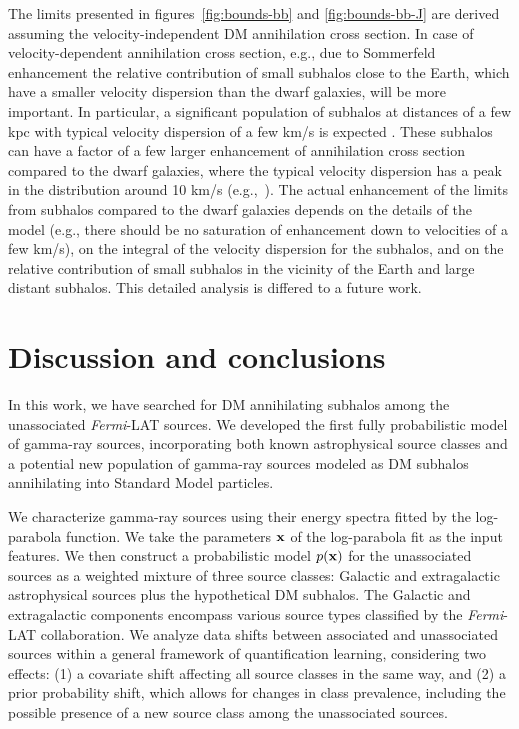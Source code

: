 \documentclass[12pt, a4paper]{article}
\newcommand{\Fermi}{{\sl Fermi}}
\begin{document}
The limits presented in figures~\ref{fig:bounds-bb} and \ref{fig:bounds-bb-J} are derived assuming the velocity-independent DM annihilation cross section.
In case of velocity-dependent annihilation cross section, e.g., due to Sommerfeld enhancement \cite{2009PhRvD..79a5014A, Piccirillo:2022qet, Lacroix:2022cjm, Facchinetti:2022jtd}
the relative contribution of small subhalos close to the Earth, which have a smaller velocity dispersion than the dwarf galaxies, will be more important.
In particular, a significant population of subhalos at distances of a few kpc with typical velocity dispersion of a few km/s is expected \cite{2024MNRAS.530.2496A}.
These subhalos can have a factor of a few larger enhancement of annihilation cross section compared to the dwarf galaxies, where the typical velocity dispersion has a peak in the distribution around 10 km/s (e.g.,~\cite{2018JCAP...04..035L}).
The actual enhancement of the limits from subhalos compared to the dwarf galaxies depends on the details of the model (e.g., there should be no saturation of enhancement down to velocities of a few km/s), on the integral of the velocity dispersion for the subhalos, and on the relative contribution of small subhalos in the vicinity of the Earth and large distant subhalos.
This detailed analysis is differed to a future work.

\section{Discussion and conclusions}
\label{sec:conclusions}
In this work, we have searched for DM annihilating subhalos among the unassociated \Fermi-LAT sources. We developed the first fully probabilistic model of gamma-ray sources, incorporating both known astrophysical source classes and a potential new population of gamma-ray sources modeled as DM subhalos annihilating into Standard Model particles. 

We characterize gamma-ray sources using their  energy spectra fitted by the log-parabola function.
We take the parameters $\bf x$ of the log-parabola fit as the input features. 
We then
construct a probabilistic model $p({\bf x})$ for the unassociated sources as a weighted mixture of three source classes: Galactic and extragalactic astrophysical sources plus the hypothetical DM subhalos. The Galactic and extragalactic components encompass various source types classified by the \Fermi-LAT collaboration. We analyze data shifts between associated and unassociated sources within a general framework of quantification learning, considering two effects: (1) a covariate shift affecting all source classes in the same way, and (2) a prior probability shift, which allows for changes in class prevalence, including the possible presence of a new source class among the unassociated sources.
\end{document}
